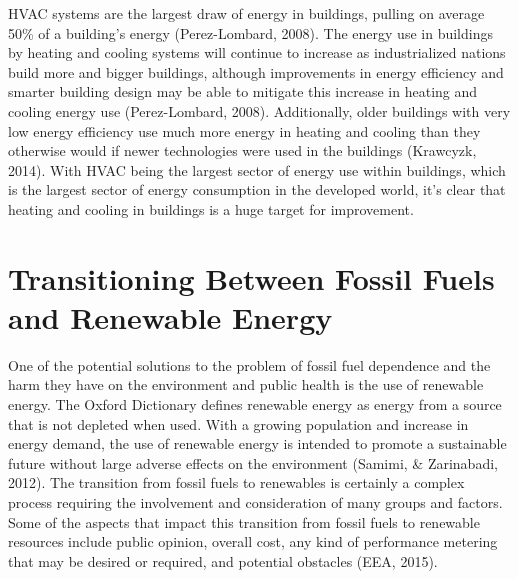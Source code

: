   \par HVAC systems are the largest draw of energy in buildings, pulling on average 50\% of a building's energy (Perez-Lombard, 2008). The energy use in buildings by heating and cooling systems will continue to increase as industrialized nations build more and bigger buildings, although improvements in energy efficiency and smarter building design may be able to mitigate this increase in heating and cooling energy use (Perez-Lombard, 2008). Additionally, older buildings with very low energy efficiency use much more energy in heating and cooling than they otherwise would if newer technologies were used in the buildings (Krawcyzk, 2014). With HVAC being the largest sector of energy use within buildings, which is the largest sector of energy consumption in the developed world, it's clear that heating and cooling in buildings is a huge target for improvement.

  \section{Transitioning Between Fossil Fuels and Renewable Energy}
  \par One of the potential solutions to the problem of fossil fuel dependence and the harm they have on the environment and public health is the use of renewable energy. The Oxford Dictionary defines renewable energy as energy from a source that is not depleted when used. With a growing population and increase in energy demand, the use of renewable energy is intended to promote a sustainable future without large adverse effects on the environment (Samimi, \& Zarinabadi, 2012). The transition from fossil fuels to renewables is certainly a complex process requiring the involvement and consideration of many groups and factors. Some of the aspects that impact this transition from fossil fuels to renewable resources include public opinion, overall cost, any kind of performance metering that may be desired or required, and potential obstacles (EEA, 2015).

